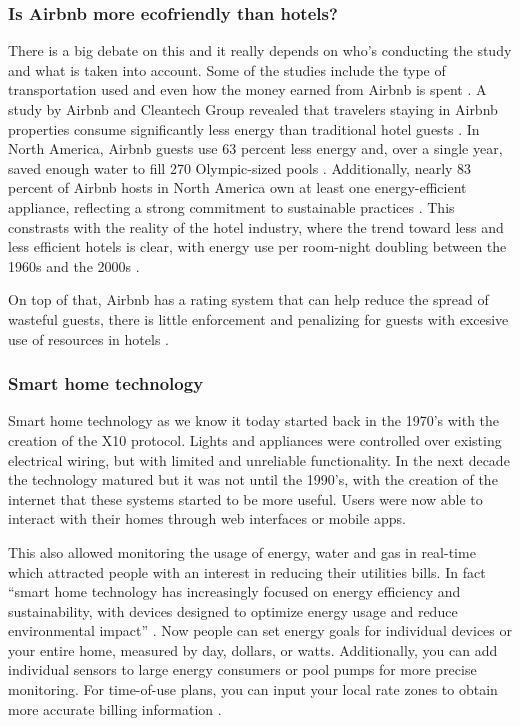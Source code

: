 \documentclass[12pt]{extarticle}
\begin{document}
\subsubsection{Is Airbnb more ecofriendly than hotels?}

There is a big debate on this and it really depends on who's conducting the study and what is taken into account. Some of the studies include the type of transportation used and even 
how the money earned from Airbnb is spent \cite{Power2021}. A study by Airbnb and Cleantech Group revealed that travelers staying in Airbnb properties consume significantly less energy 
than traditional hotel guests \cite{Simon2014}. In North America, Airbnb guests use 63 percent less energy and, over a single year, saved enough water to fill 270 Olympic-sized pools
 \cite{Simon2014}. Additionally, nearly 83 percent of Airbnb hosts in North America own at least one energy-efficient appliance, reflecting a strong commitment to sustainable practices
 \cite{Simon2014}. This constrasts with the reality of the hotel industry, where the trend toward less and less efficient hotels is clear, with energy use per room-night doubling between 
 the 1960s and the 2000s \cite{Prairie2012}. 
 
On top of that, Airbnb has a rating system that can help reduce the spread of wasteful guests, there is little enforcement and penalizing for
guests with excesive use of resources in hotels \cite{Webb2014}.

\subsubsection{Smart home technology}

Smart home technology as we know it today started back in the 1970's with the creation of the X10 protocol\cite{Caflisch2023}. Lights and appliances were controlled over existing 
electrical wiring, but with limited and unreliable functionality. In the next decade the technology matured but it was not until the 1990's, with the creation of the internet that 
these systems started to be more useful. Users were now able to interact with their homes through web interfaces or mobile apps.

This also allowed monitoring the usage of energy, water and gas in real-time which attracted people with an interest in reducing their utilities bills. In fact \enquote{smart home technology 
has increasingly focused on energy efficiency and sustainability, with devices designed to optimize energy usage and reduce environmental impact} \cite{Caflisch2023}. Now people can 
set energy goals for individual devices or your entire home, measured by day, dollars, or watts. Additionally, you can add individual sensors to large energy consumers or pool pumps 
for more precise monitoring. For time-of-use plans, you can input your local rate zones to obtain more accurate billing information \cite{SanSone2022}.
\end{document}
